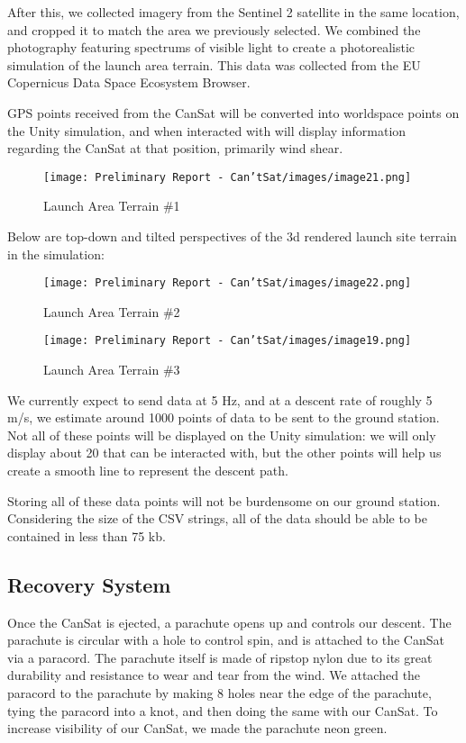 \documentclass[10pt,twocolumn]{article}
\begin{document}
After this, we collected imagery from the Sentinel 2 satellite in the same location, and cropped it to match the area we previously selected. We combined the photography featuring spectrums of visible light to create a photorealistic simulation of the launch area terrain. This data was collected from the EU Copernicus Data Space Ecosystem Browser. 

GPS points received from the CanSat will be converted into worldspace points on the Unity simulation, and when interacted with will display information regarding the CanSat at that position, primarily wind shear.

\begin{figure}[H]
\centering
\texttt{[image: Preliminary Report - Can'tSat/images/image21.png]}  
\caption{\label{fig:LaunchA1} Launch Area Terrain \#1}
\end{figure}

Below are top-down and tilted perspectives of the 3d rendered launch site terrain in the simulation:

\begin{figure}[H]
\centering
\texttt{[image: Preliminary Report - Can'tSat/images/image22.png]}  
\caption{\label{fig:LaunchA2} Launch Area Terrain \#2}
\end{figure}

\begin{figure}[H]
\centering
\texttt{[image: Preliminary Report - Can'tSat/images/image19.png]}  
\caption{\label{fig:LaunchA3} Launch Area Terrain \#3}
\end{figure}

We currently expect to send data at 5 Hz, and at a descent rate of roughly 5 m/s, we estimate around 1000 points of data to be sent to the ground station. Not all of these points will be displayed on the Unity simulation: we will only display about 20 that can be interacted with, but the other points will help us create a smooth line to represent the descent path.

Storing all of these data points will not be burdensome on our ground station. Considering the size of the CSV strings, all of the data should be able to be contained in less than 75 kb.

\subsection{\textbf{Recovery System}}

Once the CanSat is ejected, a parachute opens up and controls our descent. The parachute is circular with a hole to control spin, and is attached to the CanSat via a paracord. The parachute itself is made of ripstop nylon due to its great durability and resistance to wear and tear from the wind. We attached the paracord to the parachute by making 8 holes near the edge of the parachute, tying the paracord into a knot, and then doing the same with our CanSat. To increase visibility of our CanSat, we made the parachute neon green.
\end{document}
